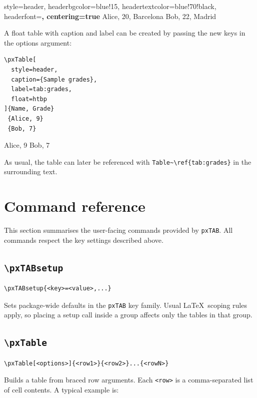 \documentclass[11pt,a4paper]{article}
\begin{document}
\pxTABsetup
  {
    style=header,
    headerbgcolor=blue!15,
    headertextcolor=blue!70!black,
    headerfont=\sffamily\bfseries,
    centering=true
  }
        {Alice, 20, Barcelona}
        {Bob, 22, Madrid}

A float table with caption and label can be created by passing the new
keys in the options argument:

\begin{verbatim}
\pxTable[
  style=header,
  caption={Sample grades},
  label=tab:grades,
  float=htbp
]{Name, Grade}
 {Alice, 9}
 {Bob, 7}
\end{verbatim}

 {Alice, 9}
 {Bob, 7}

As usual, the table can later be referenced with
\verb|Table~\ref{tab:grades}| in the surrounding text.

\section{Command reference}

This section summarises the user-facing commands provided by
\texttt{pxTAB}.  All commands respect the key settings described
above.

\subsection{\texttt{\textbackslash pxTABsetup}}

\begin{verbatim}
\pxTABsetup{<key>=<value>,...}
\end{verbatim}

Sets package-wide defaults in the \texttt{pxTAB} key family.
Usual \LaTeX\ scoping rules apply, so placing a setup call inside a
group affects only the tables in that group.

\subsection{\texttt{\textbackslash pxTable}}

\begin{verbatim}
\pxTable[<options>]{<row1>}{<row2>}...{<rowN>}
\end{verbatim}

Builds a table from braced row arguments.  Each \verb|<row>| is a
comma-separated list of cell contents.  A typical example is:
\end{document}

